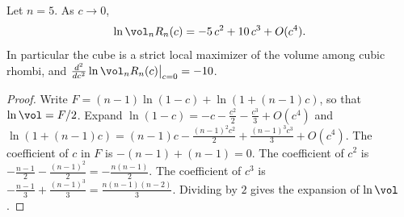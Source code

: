 \begin{theorem}\label{thm:main}
Let $n=5$. As $c\to0$,
\[
\ln\vol_nR_n(c)=-5\,c^2+10\,c^3+O(c^4).
\]
In particular the cube is a strict local maximizer of the volume among cubic rhombi, and $\frac{d^2}{dc^2}\ln\vol_nR_n(c)\big|_{c=0}=-10$.
\end{theorem}
\begin{proof}
Write $F=(n-1)\ln(1-c)+\ln(1+(n-1)c)$, so that $\ln\vol=F/2$.
Expand $\ln(1-c)=-c-\frac{c^2}{2}-\frac{c^3}{3}+O(c^4)$ and $\ln(1+(n-1)c)=(n-1)c-\frac{(n-1)^2c^2}{2}+\frac{(n-1)^3c^3}{3}+O(c^4)$.
The coefficient of $c$ in $F$ is $-(n-1)+(n-1)=0$.
The coefficient of $c^2$ is $-\frac{n-1}{2}-\frac{(n-1)^2}{2}=-\frac{n(n-1)}{2}$.
The coefficient of $c^3$ is $-\frac{n-1}{3}+\frac{(n-1)^3}{3}=\frac{n(n-1)(n-2)}{3}$.
Dividing by $2$ gives the expansion of $\ln\vol$.
\end{proof}
